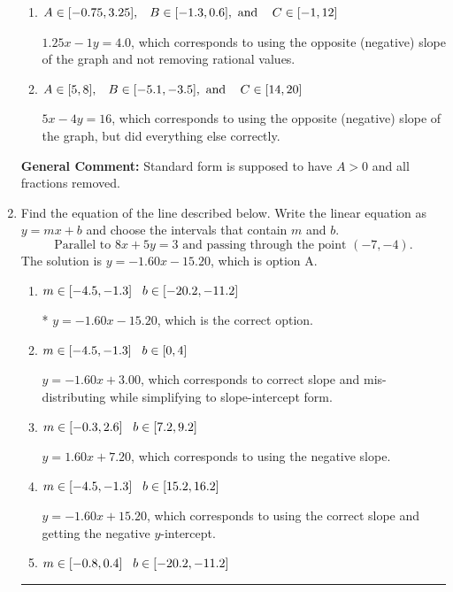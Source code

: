 \documentclass{extbook}[14pt]
\newcommand{\litem}[1]{\item #1

\rule{\textwidth}{0.4pt}}
\begin{document}
\begin{enumerate}
{\begin{enumerate}[label=\Alph*.]
 $1.25x + 1y = -4.0$, which corresponds to not removing rational values for Standard Form.
\item \( A \in [-0.75, 3.25], \hspace{3mm} B \in [-1.3, 0.6], \text{ and } \hspace{3mm} C \in [-1, 12] \)

 $1.25x - 1y = 4.0$, which corresponds to using the opposite (negative) slope of the graph and not removing rational values.
\item \( A \in [5, 8], \hspace{3mm} B \in [-5.1, -3.5], \text{ and } \hspace{3mm} C \in [14, 20] \)

 $5x - 4y = 16$, which corresponds to using the opposite (negative) slope of the graph, but did everything else correctly.
\end{enumerate}

\textbf{General Comment:} Standard form is supposed to have $A > 0$ and all fractions removed.
}
\litem{
Find the equation of the line described below. Write the linear equation as $ y=mx+b $ and choose the intervals that contain $m$ and $b$.
\[ \text{Parallel to } 8 x + 5 y = 3 \text{ and passing through the point } (-7, -4). \]
The solution is \( y = -1.60x - 15.20 \), which is option A.\begin{enumerate}[label=\Alph*.]
\item \( m \in [-4.5, -1.3] \hspace*{3mm} b \in [-20.2, -11.2] \)

* $y = -1.60x - 15.20$, which is the correct option.
\item \( m \in [-4.5, -1.3] \hspace*{3mm} b \in [0, 4] \)

 $y = -1.60x + 3.00$, which corresponds to correct slope and mis-distributing while simplifying to slope-intercept form.
\item \( m \in [-0.3, 2.6] \hspace*{3mm} b \in [7.2, 9.2] \)

 $y = 1.60x + 7.20$, which corresponds to using the negative slope.
\item \( m \in [-4.5, -1.3] \hspace*{3mm} b \in [15.2, 16.2] \)

 $y = -1.60x + 15.20$, which corresponds to using the correct slope and getting the negative $y$-intercept.
\item \( m \in [-0.8, 0.4] \hspace*{3mm} b \in [-20.2, -11.2] \)


\end{enumerate}}
\end{enumerate}
\end{document}
